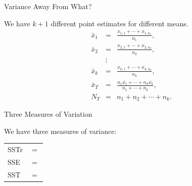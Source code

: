 \begin{frame}{Variance Away From What?}

  We have $k+1$ different point estimates for different means.
  \begin{eqnarray*}
    \bar{x}_1 & = & \frac{x_{1,1} + \cdots + x_{1,n_1}}{n_1}, \\
    \bar{x}_2 & = & \frac{x_{2,1} + \cdots + x_{2,n_2}}{n_2}, \\
              & \vdots & \\
    \bar{x}_k & = & \frac{x_{k,1} + \cdots + x_{k,n_k}}{n_k}, \\
    \bar{x}_T & = & \frac{n_1 \bar{x_1} + \cdots + n_k \bar{x_k}}{n_1+\cdots+n_k}, \\
    N_T       & = & n_1+n_2+\cdots+n_k.
  \end{eqnarray*}
  
\end{frame}

\begin{frame}{Three Measures of Variation}

  We have three measures of variance: \\
  \begin{tabular}{ll}
    SSTr & $=$ \\
    SSE  & $=$ \\
    SST  & $=$  
  \end{tabular}
  
\end{frame}

